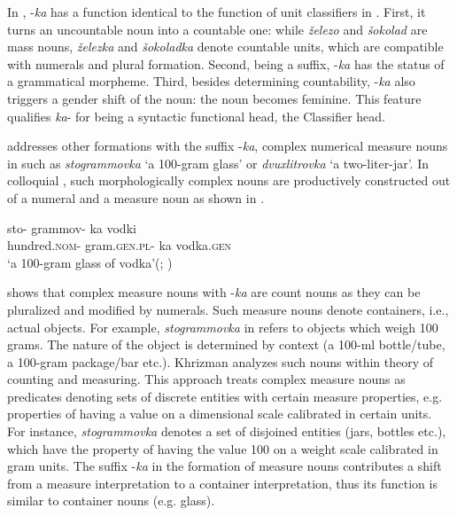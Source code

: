 \documentclass[output=paper]{langscibook}
\begin{document}
\noindent In , -\textit{ka} has a function identical to the function of unit classifiers in . First,  it turns an uncountable noun into a countable one: while \textit{železo} and \textit{šokolad} are mass nouns, \textit{železka} and \textit{šokoladka} denote countable units, which are compatible with numerals and plural formation. Second, being a suffix, -\textit{ka} has the status of a grammatical morpheme. Third, besides determining countability, -\textit{ka} also triggers a gender shift of the noun: the noun becomes feminine. This feature qualifies \textit{ka}- for being a syntactic functional head, the Classifier head.

 addresses other formations with the suffix -\textit{ka}, complex numerical measure nouns in  such as \textit{stogrammovka} `a 100-gram glass' or \textit{dvuxlitrovka} `a two-liter-jar'. In colloquial , such morphologically complex nouns are productively constructed out of a numeral and a measure noun as shown in .

\ea \label{ex:19}
\gll sto- 	grammov- 	ka 		vodki\\
  hundred.\textsc{nom}-	gram.\textsc{gen.pl}-	ka 					vodka.\textsc{gen} \\
\glt `a 100-gram glass of vodka'\hfill (; )
\z

\noindent \citeauthor{Khrizman2021} shows that complex measure nouns with -\textit{ka} are count nouns as they can be pluralized and modified by numerals. Such measure nouns denote containers, i.e., actual objects. For example, \textit{stogrammovka} in  refers to objects which weigh 100 grams. The nature of the object is determined by context (a 100-ml bottle/tube, a 100-gram package/bar etc.). Khrizman analyzes such nouns within  theory of counting and measuring. This approach treats complex measure nouns as predicates denoting sets of discrete entities with certain measure properties, e.g. properties of having a value on a dimensional scale calibrated in certain units. For instance, \textit{stogrammovka} denotes a set of disjoined entities (jars, bottles etc.), which have the property of having the value 100 on a weight scale calibrated in gram units. The suffix -\textit{ka} in the formation of measure nouns contributes a shift from a measure interpretation to a container interpretation, thus its function is similar to container nouns (e.g. glass).

\end{document}

